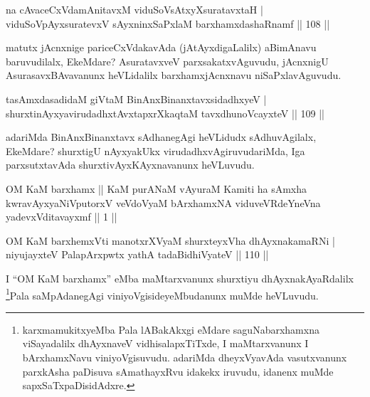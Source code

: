 
\begin{shl}
na cAvaceCxVdamAnitavxM viduSoV\s sAtxyXsuratavxtaH  | \\
viduSoV\s pAyxsuratevxV sAyxninxSaPxlaM barxhamxdashaRnamf \hfill||  108 ||  
\end{shl}

\begin{artha}
matutx jAcnxnige pariceCxVdakavAda (jAtAyxdigaLalilx) aBimAnavu baruvudilalx, EkeMdare? AsuratavxveV parxsakatxvAguvudu, jAcnxnigU AsurasavxBAvavanunx heVLidalilx barxhamxjAcnxnavu niSaPxlavAguvudu.
\end{artha}


\begin{shl}
tasAmxdasadidaM giVtaM BinAnxBinanxtavxsidadhxyeV  | \\
shurxtinAyxyavirudadhxtAvxtapxrXkaqtaM tavxdhunoVcayxteV \hfill||  109 ||  
\end{shl}

\begin{artha}
adariMda BinAnxBinanxtavx sAdhanegAgi heVLidudx sAdhuvAgilalx, EkeMdare? shurxtigU nAyxyakUkx virudadhxvAgiruvudariMda, Iga parxsutxtavAda shurxtivAyxKAyxnavanunx heVLuvudu.
\end{artha}


\begin{kandikeshl}
OM KaM barxhamx || KaM purANaM vAyuraM Kamiti ha sAmxha kwravAyxyaNiVputorxV veVdoV\s yaM bArxhamxNA viduveVRdeYneVna yadevxVditavayxmf || 1 ||
\end{kandikeshl}

\centerline{}


\begin{shl}
OM KaM barxhemxVti manotxrXV\s yaM shurxteyxVha dhAyxnakamaRNi  | \\
niyujayxteV PalapArxpwtx yathA tadaBidhiVyateV \hfill||  110 ||  
\end{shl}

\begin{artha}
I ``OM KaM barxhamx'' eMba maMtarxvanunx shurxtiyu dhAyxnakAyaRdalilx \footnote{karxmamukitxyeMba Pala lABakAkxgi eMdare saguNabarxhamxna viSayadalilx dhAyxnaveV vidhisalapxTiTxde, I maMtarxvanunx I bArxhamxNavu viniyoVgisuvudu. adariMda dheyxVyavAda vasutxvanunx parxkAsha paDisuva sAmathayxRvu idakekx iruvudu, idanenx muMde sapxSaTxpaDisidAdxre.}Pala saMpAdanegAgi viniyoVgisideyeMbudanunx muMde heVLuvudu.
\end{artha}


